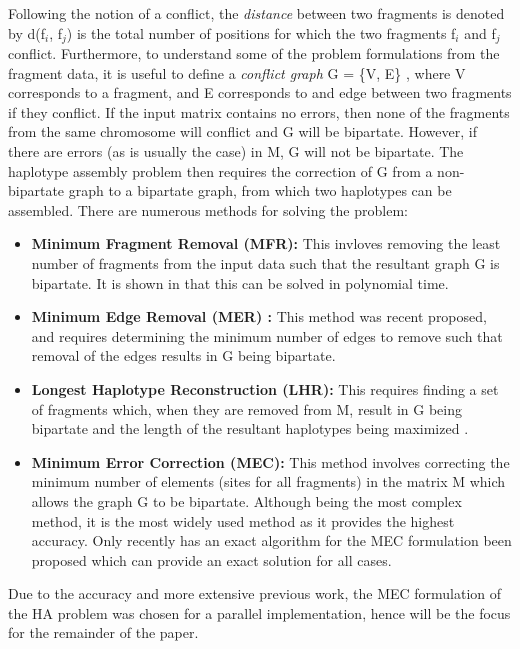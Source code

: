\documentclass[10pt,a4paer,twocolumn]{article}
\begin{document}
Following the notion of a conflict, the \textit{distance} between two fragments is
denoted by d(f$_i$, f$_j$) is the total number of positions for which the two fragments f$_i$ and f$_j$
conflict. Furthermore, to understand some of the problem formulations from the fragment data, it is useful to
define a \textit{conflict graph} G = \{V, E\} \cite{lancia:2001}, where V corresponds to a fragment, and E
corresponds to and edge between two fragments if they conflict. If the input matrix contains no errors, then none
of the fragments from the same chromosome will conflict and G will be bipartate. However, if there are 
errors (as is usually the case) in M, G will not be bipartate. The haplotype assembly problem then requires 
the correction of G from a non-bipartate graph to a bipartate graph, from which two haplotypes can be
assembled. There are numerous methods for solving the problem:
\begin{itemize}[noitemsep]
    \item{ \textbf{Minimum Fragment Removal (MFR):} This invloves removing the least number of fragments 
            from the input data such that the resultant graph G is bipartate. It is shown in 
            \cite{lancia:2001} that this can be solved in polynomial time.
        }
\item{ \textbf{Minimum Edge Removal (MER) \cite{aguiar:2012}:} This method was recent proposed, and requires
        determining the minimum number of edges to remove such that removal of the edges results in G being 
        bipartate.
    }
\item{ \textbf{Longest Haplotype Reconstruction (LHR):} This requires finding a set of fragments which,
        when they are removed from M, result in G being bipartate and the length of the resultant 
        haplotypes being maximized \cite{schwartz:2010}. 
    }
\item{ \textbf{Minimum Error Correction (MEC):} This method involves correcting the minimum number of 
        elements (sites for all fragments) in the matrix M which allows the graph G to be bipartate. 
        Although being the most complex method, it is the most widely used method as it provides the 
        highest accuracy. Only recently has an exact algorithm for the MEC formulation been proposed which 
        can provide an exact solution for all cases.
    }
\end{itemize}
Due to the accuracy and more extensive previous work, the MEC formulation of the HA problem was chosen for a
parallel implementation, hence will be the focus for the remainder of the paper.
\end{document}

